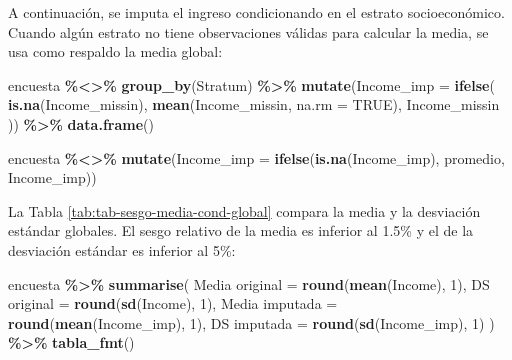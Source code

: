 \documentclass[
  spanish,
  12pt,
]{book}
\newenvironment{Shaded}{\begin{snugshade}}{\end{snugshade}}
\newcommand{\AttributeTok}[1]{\textcolor[rgb]{0.13,0.29,0.53}{#1}}
\newcommand{\ConstantTok}[1]{\textcolor[rgb]{0.56,0.35,0.01}{#1}}
\newcommand{\DecValTok}[1]{\textcolor[rgb]{0.00,0.00,0.81}{#1}}
\newcommand{\FunctionTok}[1]{\textcolor[rgb]{0.13,0.29,0.53}{\textbf{#1}}}
\newcommand{\NormalTok}[1]{#1}
\newcommand{\OtherTok}[1]{\textcolor[rgb]{0.56,0.35,0.01}{#1}}
\newcommand{\SpecialCharTok}[1]{\textcolor[rgb]{0.81,0.36,0.00}{\textbf{#1}}}
\newcommand{\StringTok}[1]{\textcolor[rgb]{0.31,0.60,0.02}{#1}}
\begin{document}
A continuación, se imputa el ingreso condicionando en el estrato socioeconómico. Cuando algún estrato no tiene observaciones válidas para calcular la media, se usa como respaldo la media global:

\begin{Shaded}
\begin{Highlighting}[]
\NormalTok{encuesta }\SpecialCharTok{\%\textless{}\textgreater{}\%}
  \FunctionTok{group\_by}\NormalTok{(Stratum) }\SpecialCharTok{\%\textgreater{}\%}
  \FunctionTok{mutate}\NormalTok{(}\AttributeTok{Income\_imp =} \FunctionTok{ifelse}\NormalTok{(}
    \FunctionTok{is.na}\NormalTok{(Income\_missin),}
    \FunctionTok{mean}\NormalTok{(Income\_missin, }\AttributeTok{na.rm =} \ConstantTok{TRUE}\NormalTok{),}
\NormalTok{    Income\_missin}
\NormalTok{  )) }\SpecialCharTok{\%\textgreater{}\%}
  \FunctionTok{data.frame}\NormalTok{()}

\NormalTok{encuesta }\SpecialCharTok{\%\textless{}\textgreater{}\%}
  \FunctionTok{mutate}\NormalTok{(}\AttributeTok{Income\_imp =} \FunctionTok{ifelse}\NormalTok{(}\FunctionTok{is.na}\NormalTok{(Income\_imp), promedio, Income\_imp))}
\end{Highlighting}
\end{Shaded}

La Tabla \ref{tab:tab-sesgo-media-cond-global} compara la media y la desviación estándar globales. El sesgo relativo de la media es inferior al 1.5\% y el de la desviación estándar es inferior al 5\%:

\begin{Shaded}
\begin{Highlighting}[]
\NormalTok{encuesta }\SpecialCharTok{\%\textgreater{}\%}
  \FunctionTok{summarise}\NormalTok{(}
    \StringTok{\textasciigrave{}}\AttributeTok{Media original}\StringTok{\textasciigrave{}}  \OtherTok{=} \FunctionTok{round}\NormalTok{(}\FunctionTok{mean}\NormalTok{(Income), }\DecValTok{1}\NormalTok{),}
    \StringTok{\textasciigrave{}}\AttributeTok{DS original}\StringTok{\textasciigrave{}}     \OtherTok{=} \FunctionTok{round}\NormalTok{(}\FunctionTok{sd}\NormalTok{(Income), }\DecValTok{1}\NormalTok{),}
    \StringTok{\textasciigrave{}}\AttributeTok{Media imputada}\StringTok{\textasciigrave{}}  \OtherTok{=} \FunctionTok{round}\NormalTok{(}\FunctionTok{mean}\NormalTok{(Income\_imp), }\DecValTok{1}\NormalTok{),}
    \StringTok{\textasciigrave{}}\AttributeTok{DS imputada}\StringTok{\textasciigrave{}}     \OtherTok{=} \FunctionTok{round}\NormalTok{(}\FunctionTok{sd}\NormalTok{(Income\_imp), }\DecValTok{1}\NormalTok{)}
\NormalTok{  ) }\SpecialCharTok{\%\textgreater{}\%} \FunctionTok{tabla\_fmt}\NormalTok{()}
\end{Highlighting}
\end{Shaded}
\end{document}
